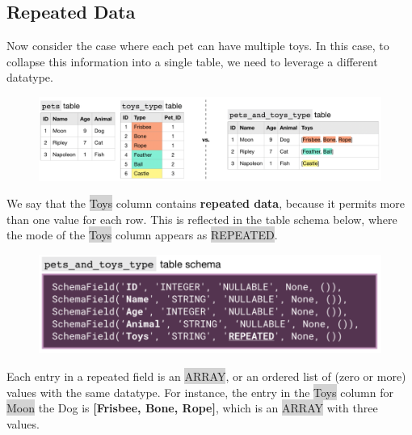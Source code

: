 \documentclass[11pt]{article}
\begin{document}
{{{{{{{{\subsection{Repeated Data}
Now consider the case where each pet can have multiple toys. In this case, to collapse this information into a single table, we need to leverage a different datatype.
\begin{figure}[H]
\includegraphics[scale = 0.65]{6_4}
\centering
\end{figure}
\vspace{-4mm}
We say that the \colorbox{lightgray}{Toys} column contains \textbf{repeated data}, because it permits more than one value for each row. This is reflected in the table schema below, where the mode of the \colorbox{lightgray}{Toys} column appears as \colorbox{lightgray}{REPEATED}.
\begin{figure}[H]
\includegraphics[scale = 0.8]{6_5}
\centering
\end{figure}
Each entry in a repeated field is an \colorbox{lightgray}{ARRAY}, or an ordered list of (zero or more) values with the same datatype. For instance, the entry in the \colorbox{lightgray}{Toys} column for \colorbox{lightgray}{Moon} the Dog is \textbf{[Frisbee, Bone, Rope]}, which is an \colorbox{lightgray}{ARRAY} with three values.

}}}}}}}}
\end{document}
